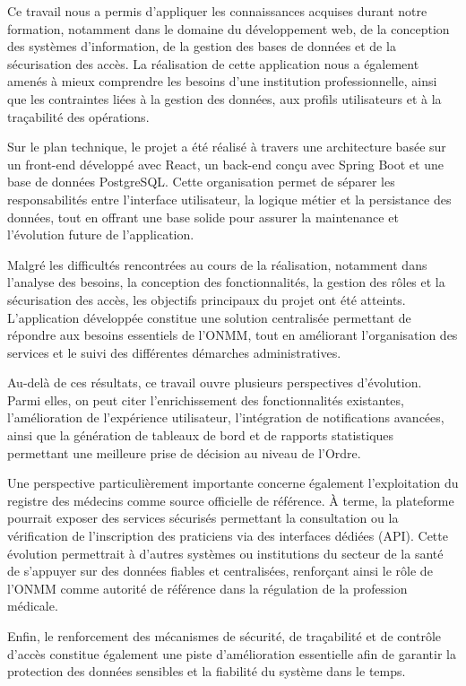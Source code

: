 ﻿\documentclass[12pt,a4paper]{report}
\begin{document}
Ce travail nous a permis d’appliquer les connaissances acquises durant notre formation, notamment dans le domaine du développement web, de la conception des systèmes d’information, de la gestion des bases de données et de la sécurisation des accès. La réalisation de cette application nous a également amenés à mieux comprendre les besoins d’une institution professionnelle, ainsi que les contraintes liées à la gestion des données, aux profils utilisateurs et à la traçabilité des opérations.

Sur le plan technique, le projet a été réalisé à travers une architecture basée sur un front-end développé avec React, un back-end conçu avec Spring Boot et une base de données PostgreSQL. Cette organisation permet de séparer les responsabilités entre l’interface utilisateur, la logique métier et la persistance des données, tout en offrant une base solide pour assurer la maintenance et l’évolution future de l’application.

Malgré les difficultés rencontrées au cours de la réalisation, notamment dans l’analyse des besoins, la conception des fonctionnalités, la gestion des rôles et la sécurisation des accès, les objectifs principaux du projet ont été atteints. L’application développée constitue une solution centralisée permettant de répondre aux besoins essentiels de l’ONMM, tout en améliorant l’organisation des services et le suivi des différentes démarches administratives.

Au-delà de ces résultats, ce travail ouvre plusieurs perspectives d’évolution. Parmi elles, on peut citer l’enrichissement des fonctionnalités existantes, l’amélioration de l’expérience utilisateur, l’intégration de notifications avancées, ainsi que la génération de tableaux de bord et de rapports statistiques permettant une meilleure prise de décision au niveau de l’Ordre.

Une perspective particulièrement importante concerne également l’exploitation du registre des médecins comme source officielle de référence. À terme, la plateforme pourrait exposer des services sécurisés permettant la consultation ou la vérification de l’inscription des praticiens via des interfaces dédiées (API). Cette évolution permettrait à d’autres systèmes ou institutions du secteur de la santé de s’appuyer sur des données fiables et centralisées, renforçant ainsi le rôle de l’ONMM comme autorité de référence dans la régulation de la profession médicale.

Enfin, le renforcement des mécanismes de sécurité, de traçabilité et de contrôle d’accès constitue également une piste d’amélioration essentielle afin de garantir la protection des données sensibles et la fiabilité du système dans le temps.
\end{document}
